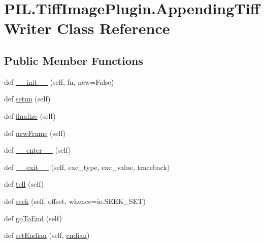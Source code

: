 \hypertarget{classPIL_1_1TiffImagePlugin_1_1AppendingTiffWriter}{}\section{P\+I\+L.\+Tiff\+Image\+Plugin.\+Appending\+Tiff\+Writer Class Reference}
\label{classPIL_1_1TiffImagePlugin_1_1AppendingTiffWriter}
\subsection*{Public Member Functions}
\begin{DoxyCompactItemize}
\item 
def \hyperlink{classPIL_1_1TiffImagePlugin_1_1AppendingTiffWriter_a5dfb8fbe7585ae60f1d2d2cdd0ef32c5}{\+\_\+\+\_\+init\+\_\+\+\_\+} (self, fn, new=False)
\item 
def \hyperlink{classPIL_1_1TiffImagePlugin_1_1AppendingTiffWriter_a1e9a88d7d147c0eb62f10d4dd14fb590}{setup} (self)
\item 
def \hyperlink{classPIL_1_1TiffImagePlugin_1_1AppendingTiffWriter_afc57aed1059bc400e3198fbbe8ec5672}{finalize} (self)
\item 
def \hyperlink{classPIL_1_1TiffImagePlugin_1_1AppendingTiffWriter_ad56ab7c1431ee54d484a36e5b1076d86}{new\+Frame} (self)
\item 
def \hyperlink{classPIL_1_1TiffImagePlugin_1_1AppendingTiffWriter_a84ff3df085475520a1fca80be9eabc59}{\+\_\+\+\_\+enter\+\_\+\+\_\+} (self)
\item 
def \hyperlink{classPIL_1_1TiffImagePlugin_1_1AppendingTiffWriter_a906ef525be20c3d27c8764e151878d38}{\+\_\+\+\_\+exit\+\_\+\+\_\+} (self, exc\+\_\+type, exc\+\_\+value, traceback)
\item 
def \hyperlink{classPIL_1_1TiffImagePlugin_1_1AppendingTiffWriter_aba62a36e5f511c6130ae7aeba2cd7522}{tell} (self)
\item 
def \hyperlink{classPIL_1_1TiffImagePlugin_1_1AppendingTiffWriter_aff7ae7fcc18cd52b168849e764592413}{seek} (self, offset, whence=io.\+S\+E\+E\+K\+\_\+\+S\+ET)
\item 
def \hyperlink{classPIL_1_1TiffImagePlugin_1_1AppendingTiffWriter_a45de324c73548a9679459b4e5e50f9bc}{go\+To\+End} (self)
\item 
def \hyperlink{classPIL_1_1TiffImagePlugin_1_1AppendingTiffWriter_a4b6b7919468fc00592968e4a81fae2a5}{set\+Endian} (self, \hyperlink{classPIL_1_1TiffImagePlugin_1_1AppendingTiffWriter_a47220a6f1fb010f5be093af0a5a9d6df}{endian})

\end{DoxyCompactItemize}
